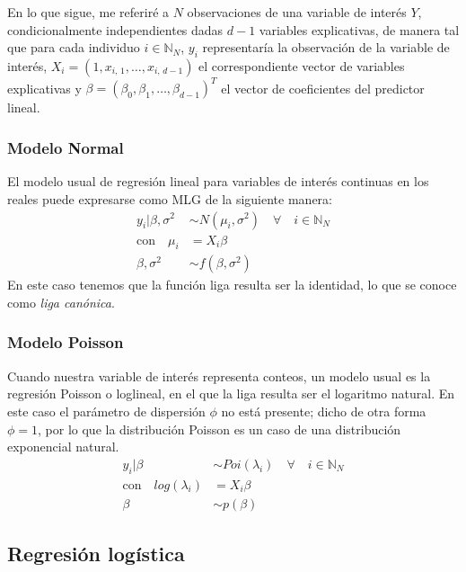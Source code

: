 En lo que sigue, me referiré a $N$ observaciones de una variable de interés $Y$, condicionalmente independientes dadas $d-1$ variables explicativas, de manera tal que para cada individuo $i\in \mathbb{N}_N$, $y_i$ representaría la observación de la variable de interés, $X_i = (1, x_{i,\,1}, \dots ,x_{i,\,d-1})$ el correspondiente vector de variables explicativas y $\beta=(\beta_0, \beta_1, \dots, \beta_{d-1})^T$ el vector de coeficientes del predictor lineal.

\subsubsection*{Modelo Normal}

El modelo usual de regresión lineal para variables de interés continuas en los reales puede expresarse como MLG de la siguiente manera: 
\begin{align*}
y_i|\beta,\sigma^2 & \sim N(\mu_i,\sigma^2) \quad \forall \quad i \in \mathbb{N}_N \nonumber \\
\text{con} \quad \mu_i &= X_i\beta \nonumber \\
\beta,\sigma^2 &\sim f(\beta,\sigma^2)
\end{align*}
En este caso tenemos que la función liga resulta ser la identidad, lo que se conoce como \textit{liga canónica}. 

\subsubsection*{Modelo Poisson}

Cuando nuestra variable de interés representa conteos, un modelo usual es la regresión Poisson o loglineal, en el que la liga resulta ser el logaritmo natural. En este caso el parámetro de dispersión $\phi$ no está presente; dicho de otra forma $\phi=1$, por lo que la distribución Poisson es un caso de una distribución exponencial natural. 
\begin{align*}
y_i|\beta & \sim Poi(\lambda_i) \quad \forall \quad i \in \mathbb{N}_N \nonumber \\
\text{con} \quad log(\lambda_i) &= X_i\beta \nonumber \\
\beta &\sim p(\beta)
\end{align*}

\subsection{Regresión logística}\label{Sec:Pres_Logis}

